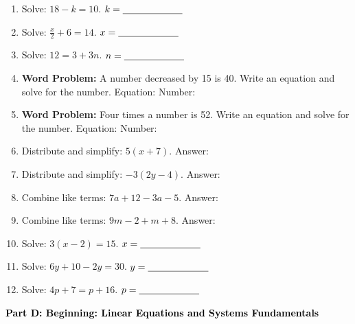 \documentclass[12pt, letterpaper, fleqn]{article}
\newcommand{\blank}{\underline{\hspace{2.2cm}}}
\newcommand{\blanklong}{\underline{\hspace{6.5cm}}}
\begin{document}
\begin{enumerate}[itemsep=2.5cm, leftmargin=0.6cm]
\begin{enumerate}[itemsep=2.5cm, leftmargin=0.6cm, resume]
\item Solve: $18 - k = 10$.
    \vspace{1cm}
    $k = \blank$
\item Solve: $\frac{x}{2} + 6 = 14$.
    \vspace{1cm}
    $x = \blank$
\item Solve: $12 = 3 + 3n$.
    \vspace{1cm}
    $n = \blank$
\item \textbf{Word Problem:} A number decreased by 15 is 40. Write an equation and solve for the number.
    \vspace{1cm}
    Equation: \blanklong
    Number: \blank
\item \textbf{Word Problem:} Four times a number is 52. Write an equation and solve for the number.
    \vspace{1cm}
    Equation: \blanklong
    Number: \blank
\item Distribute and simplify: $5(x + 7)$.
    \vspace{1cm}
    Answer: \blanklong
\item Distribute and simplify: $-3(2y - 4)$.
    \vspace{1cm}
    Answer: \blanklong
\item Combine like terms: $7a + 12 - 3a - 5$.
    \vspace{1cm}
    Answer: \blanklong
\item Combine like terms: $9m - 2 + m + 8$.
    \vspace{1cm}
    Answer: \blanklong
\item Solve: $3(x - 2) = 15$.
    \vspace{1cm}
    $x = \blank$
\item Solve: $6y + 10 - 2y = 30$.
    \vspace{1cm}
    $y = \blank$
\item Solve: $4p + 7 = p + 16$.
    \vspace{1cm}
    $p = \blank$
\end{enumerate}

\newpage

\begin{tcolorbox}[colback=customteal!20]
\large\textcolor{black}{\textbf{Part D: Beginning: Linear Equations and Systems Fundamentals}}
\end{tcolorbox}

\vspace{3mm}


\end{enumerate}
\end{document}
